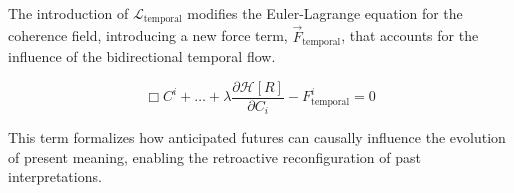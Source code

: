 The introduction of \(\mathcal{L}_{\text{temporal}}\) modifies the Euler-Lagrange equation for the coherence field, introducing a new force term, \(\vec{F}_{\text{temporal}}\), that accounts for the influence of the bidirectional temporal flow.

\begin{equation}
\Box C^i + \dots + \lambda \frac{\partial \mathcal{H}[R]}{\partial C_i} - F^i_{\text{temporal}} = 0
\end{equation}

This term formalizes how anticipated futures can causally influence the evolution of present meaning, enabling the retroactive reconfiguration of past interpretations.